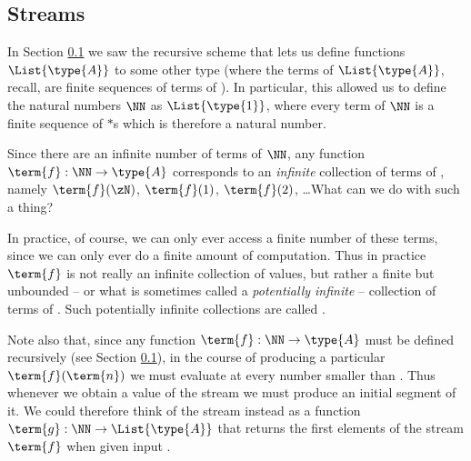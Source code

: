\newpage
\subsection{Streams}

In Section \ref{} we saw the recursive scheme that lets us define functions $\List{\type{A}}$ to some other type (where the terms of $\List{\type{A}}$, recall, are finite sequences of terms of ). In particular, this allowed us to define the natural numbers $\NN$ as $\List{\type{1}}$, where every term of $\NN$ is a finite sequence of $\ast$s which is therefore a natural number.

Since there are an infinite number of terms of $\NN$, any function  $\term{f}:\NN \to \type{A}$ corresponds to an \emph{infinite} collection of terms of , namely $\term{f}(\zN)$, $\term{f}(1)$, $\term{f}(2)$, \ldots  What can we do with such a thing?

In practice, of course, we can only ever access a finite number of these terms, since we can only ever do a finite amount of computation.  Thus in practice $\term{f}$ is not really an infinite collection of values, but rather a finite but unbounded -- or what is sometimes called a \emph{potentially infinite} -- collection of terms of .  Such potentially infinite collections are called .

Note also that, since any function $\term{f}:\NN \to \type{A}$ must be defined recursively (see Section \ref{}), in the course of producing a particular $\term{f}(\term{n})$ we must evaluate  at every number smaller than .  Thus whenever we obtain a value of the stream we must produce an initial segment of it.  
We could therefore think of the stream instead as a function $\term{g}: \NN \to \List{\type{A}}$ that returns the first  elements of the stream $\term{f}$ when given input .

